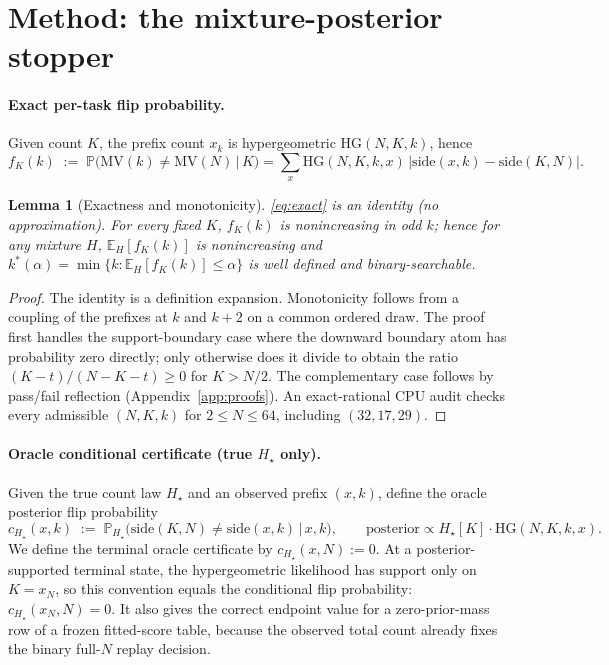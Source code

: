 \documentclass{article}
\newtheorem{lemma}{Lemma}
\theoremstyle{definition}
\theoremstyle{remark}
\newcommand{\trueH}{H_\star}
\newcommand{\oraclecert}{c_{\trueH}}
\newcommand{\HG}{\mathrm{HG}}
\newcommand{\MV}{\mathrm{MV}}
\newcommand{\E}{\mathbb{E}}
\renewcommand{\P}{\mathbb{P}}
\begin{document}
\section{Method: the mixture-posterior stopper}
\label{sec:method}

\paragraph{Exact per-task flip probability.}
Given count $K$, the prefix count $x_k$ is hypergeometric
$\HG(N,K,k)$, hence
\begin{equation}
f_K(k) \;:=\; \P\big(\MV(k)\neq\MV(N)\,\big|\,K\big)
= \sum_{x}\HG(N,K,k,x)\,\big|\mathrm{side}(x,k)-\mathrm{side}(K,N)\big|.
\label{eq:exact}
\end{equation}

\begin{lemma}[Exactness and monotonicity]
\label{lem:exact}
\eqref{eq:exact} is an identity (no approximation). For every fixed $K$,
$f_K(k)$ is nonincreasing in odd $k$; hence for any mixture $H$,
$\E_H[f_K(k)]$ is nonincreasing and
$k^*(\alpha)=\min\{k:\E_H[f_K(k)]\le\alpha\}$ is well defined and
binary-searchable.
\end{lemma}
\begin{proof}
The identity is a definition expansion. Monotonicity follows from a
coupling of the prefixes at $k$ and $k{+}2$ on a common ordered draw.  The
proof first handles the support-boundary case where the downward boundary atom
has probability zero directly; only otherwise does it divide to obtain the
ratio $(K-t)/(N-K-t)\ge0$ for $K>N/2$. The complementary case follows by
pass/fail reflection (Appendix~\ref{app:proofs}). An exact-rational CPU audit
checks every admissible $(N,K,k)$ for $2\le N\le64$, including
$(32,17,29)$.
\end{proof}

\paragraph{Oracle conditional certificate (true $\trueH$ only).}
Given the true count law $\trueH$ and an observed prefix $(x,k)$, define the
oracle posterior flip probability
\begin{equation}
\oraclecert(x,k) \;:=\; \P_{\trueH}\big(\mathrm{side}(K,N)\neq\mathrm{side}(x,k)\,\big|\,x,k\big),
\qquad \text{posterior} \propto \trueH[K]\cdot\HG(N,K,k,x).
\label{eq:cond}
\end{equation}
We define the terminal oracle certificate by $\oraclecert(x,N):=0$. At a
posterior-supported terminal state, the hypergeometric likelihood has support
only on $K=x_N$, so this convention equals the conditional flip probability:
$\oraclecert(x_N,N)=0$. It also gives the correct endpoint value for a
zero-prior-mass row of a frozen fitted-score table, because the observed total
count already fixes the binary full-$N$ replay decision.
\end{document}

